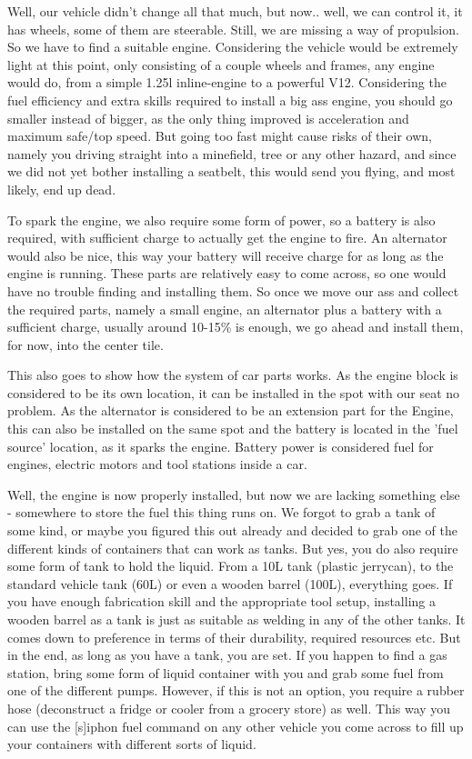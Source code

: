 \documentclass[11pt]{report}
\begin{document}
Well, our vehicle didn't change all that much, but now.. well, we can control it, it has wheels, some of them are steerable. Still, we are missing a way of propulsion. So we have to find a suitable engine. Considering the vehicle would be extremely light at this point, only consisting of a couple wheels and frames, any engine would do, from a simple 1.25l inline-engine to a powerful V12. Considering the fuel efficiency and extra skills required to install a big ass engine, you should go smaller instead of bigger, as the only thing improved is acceleration and maximum safe/top speed. But going too fast might cause risks of their own, namely you driving straight into a minefield, tree or any other hazard, and since we did not yet bother installing a seatbelt, this would send you flying, and most likely, end up dead.

To spark the engine, we also require some form of power, so a battery is also required, with sufficient charge to actually get the engine to fire. An alternator would also be nice, this way your battery will receive charge for as long as the engine is running. These parts are relatively easy to come across, so one would have no trouble finding and installing them. So once we move our ass and collect the required parts, namely a small engine, an alternator plus a battery with a sufficient charge, usually around 10-15\% is enough, we go ahead and install them, for now, into the center tile.

This also goes to show how the system of car parts works. As the engine block is considered to be its own location, it can be installed in the spot with our seat no problem. As the alternator is considered to be an extension part for the Engine, this can also be installed on the same spot and the battery is located in the 'fuel source' location, as it sparks the engine. Battery power is considered fuel for engines, electric motors and tool stations inside a car.

Well, the engine is now properly installed, but now we are lacking something else - somewhere to store the fuel this thing runs on. We forgot to grab a tank of some kind, or maybe you figured this out already and decided to grab one of the different kinds of containers that can work as tanks. But yes, you do also require some form of tank to hold the liquid. From a 10L tank (plastic jerrycan), to the standard vehicle tank (60L) or even a wooden barrel (100L), everything goes. If you have enough fabrication skill and the appropriate tool setup, installing a wooden barrel as a tank is just as suitable as welding in any of the other tanks. It comes down to preference in terms of their durability, required resources etc. But in the end, as long as you have a tank, you are set. If you happen to find a gas station, bring some form of liquid container with you and grab some fuel from one of the different pumps. However, if this is not an option, you require a rubber hose (deconstruct a fridge or cooler from a grocery store) as well. This way you can use the [s]iphon fuel command on any other vehicle you come across to fill up your containers with different sorts of liquid.
\end{document}
